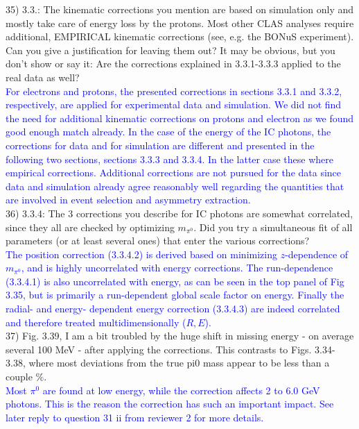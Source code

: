 35) 3.3.: The kinematic corrections you mention are based on simulation only and 
mostly take care of energy loss by the protons. Most other CLAS analyses 
require additional, EMPIRICAL kinematic corrections (see, e.g. the BONuS 
experiment). Can you give a justification for leaving them out?
It may be obvious, but you don't show or say it: Are the corrections explained 
in 3.3.1-3.3.3 applied to the real data as well?\\
\textcolor{blue}{For electrons and protons, the presented corrections in 
sections 3.3.1 and 3.3.2, respectively, are applied for experimental data and 
simulation. We did not find the need for additional kinematic corrections on 
protons and electron as we found good enough match already.
In the case of the energy of the IC photons, the corrections 
for data and for simulation are different and presented in the following two 
sections, sections 3.3.3 and 3.3.4. In the latter case
these where empirical corrections.  Additional corrections are not pursued
for the data since data and simulation already agree reasonably well regarding
the quantities that are involved in event selection and asymmetry 
extraction.}\\

36) 3.3.4: The 3 corrections you describe for IC photons are somewhat 
correlated, since they all are checked by optimizing $m_{\pi^0}$. Did you try a 
simultaneous fit of all parameters (or at least several ones) that enter the 
various corrections?\\
\textcolor{blue}{The position correction (3.3.4.2) is derived based on minimizing
$z$-dependence of $m_{\pi^0}$, and is highly uncorrelated with energy 
corrections. The run-dependence (3.3.4.1) is also uncorrelated with energy, as
can be seen in the top panel of Fig 3.35, but is primarily a run-dependent global
scale factor on energy. Finally the radial- and energy- dependent energy correction
(3.3.4.3) are indeed correlated and therefore treated multidimensionally ($R,E$).}\\

37) Fig. 3.39, I am a bit troubled by the huge shift in missing energy - on 
average several 100 MeV - after applying the corrections. This contrasts to  
Figs. 3.34-3.38, where most deviations from the true pi0 mass appear to be less  
than a couple $\%$.\\
\textcolor{blue}{Most $\pi^0$ are found at low energy, while the correction affects
2 to 6.0 GeV photons. This is the reason the correction has such an important 
impact. See later reply to question 31 ii from reviewer 2 for more details.}\\

